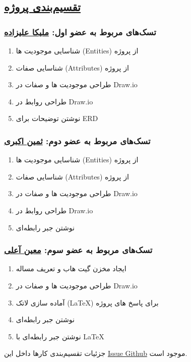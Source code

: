 \subsection*{\underline{تقسیم‌بندی پروژه}}
\subsubsection*{تسک‌های مربوط به عضو اول: \href{https://github.com/MelikaAlizadeh}{ملیکا علیزاده}}
\begin{enumerate}
	
	
	\item شناسایی موجودیت ها (Entities) از پروژه
	
	\item شناسایی صفات (Attributes) از پروژه
	
	\item طراحی موجودیت ها و صفات در Draw.io
	
	\item طراحی روابط در Draw.io
	
	\item نوشتن توضیحات برای ERD
	
\end{enumerate}
\subsubsection*{تسک‌های مربوط به عضو دوم: \href{https://github.com/saminakbari}{ثمین اکبری} }
\begin{enumerate}
	
	\item شناسایی موجودیت ها (Entities) از پروژه
	
	\item شناسایی صفات (Attributes) از پروژه
	
	\item طراحی موجودیت ها و صفات در Draw.io
	
	\item طراحی روابط در Draw.io
	
	\item نوشتن جبر رابطه‌ای
	
	
\end{enumerate}
\subsubsection*{تسک‌های مربوط به عضو سوم: \href{https://github.com/MoeeinAali}{معین آعلی}}
\begin{enumerate}
	
	\item ایجاد مخزن گیت هاب و تعریف مساله
	
	\item طراحی موجودیت ها و صفات در Draw.io
	
	\item آماده سازی لاتک (LaTeX) برای پاسخ های پروژه
	
	\item نوشتن جبر رابطه‌ای
	
	\item نوشتن جبر رابطه‌ای با LaTeX
	
	
\end{enumerate}

جزئیات تقسیم‌بندی کارها داخل این 
\href{https://github.com/MoeeinAali/DB-Project/issues/1}{Issue Github}
موجود است.